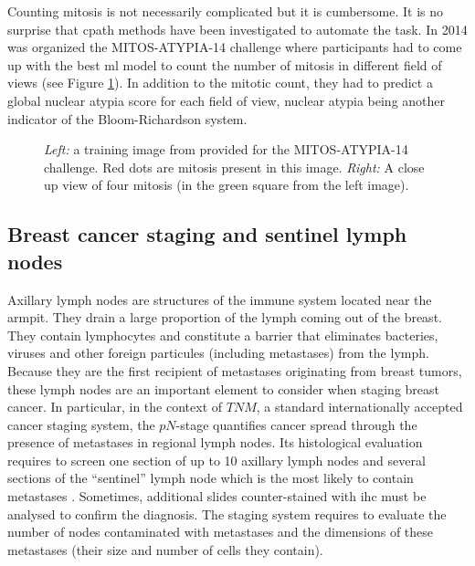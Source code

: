 Counting mitosis is not necessarily complicated but it is cumbersome. It is no surprise that \acrlong{cpath} methods have been investigated to automate the task. In 2014 was organized the MITOS-ATYPIA-14 challenge \parencite{roux2014mitos} where participants had to come up with the best \acrlong{ml} model to count the number of mitosis in different field of views (see Figure \ref{fig:backdp:mitos_atypia}). In addition to the mitotic count, they had to predict a global nuclear atypia score for each field of view, nuclear atypia being another indicator of the Bloom-Richardson system. 

\begin{figure}
  \centering
  \hspace{0.5cm}
  \caption{\textit{Left:} a training image from provided for the MITOS-ATYPIA-14 challenge. Red dots are mitosis present in this image. \textit{Right:} A close up view of four mitosis (in the green square from the left image).}
  \label{fig:backdp:mitos_atypia}
\end{figure}

\subsection{Breast cancer staging and sentinel lymph nodes}
\label{ssec:backdp:analysis_camelyon}

Axillary lymph nodes are structures of the immune system located near the armpit. They drain a large proportion of the lymph coming out of the breast. They contain lymphocytes and constitute a barrier that eliminates bacteries, viruses and other foreign particules (including metastases) from the lymph. Because they are the first recipient of metastases originating from breast tumors, these lymph nodes are an important element to consider when staging breast cancer. In particular, in the context of $TNM$, a standard internationally accepted cancer staging system, the $pN$-stage \parencite{reisenbichler2022tmnstagingbreast} quantifies cancer spread through the presence of metastases in regional lymph nodes. Its histological evaluation requires to screen one section of up to 10 axillary lymph nodes and several sections of the ``sentinel'' lymph node which is the most likely to contain metastases \parencite{weaver2010pathology}. Sometimes, additional slides counter-stained with \acrshort{ihc} must be analysed to confirm the diagnosis. The staging system requires to evaluate the number of nodes contaminated with metastases and the dimensions of these metastases (\ie their size and number of cells they contain).

